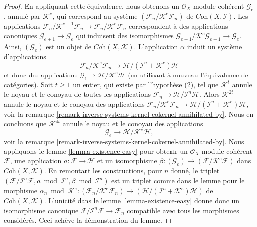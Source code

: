 \begin{proof}
\medskip\noindent
En appliquant cette équivalence, nous obtenons un $\mathcal{O}_X$-module cohérent
$\mathcal{G}_e$, annulé par $\mathcal{K}^e$, qui correspond au système
$(\mathcal{F}_n/\mathcal{K}^e\mathcal{F}_n)$ de
$\textit{Coh}(X, \mathcal{I})$. Les applications
$\mathcal{F}_n/\mathcal{K}^{e + 1}\mathcal{F}_n \to
\mathcal{F}_n/\mathcal{K}^e\mathcal{F}_n$ correspondent à des applications canoniques
$\mathcal{G}_{e + 1} \to \mathcal{G}_e$ qui induisent des isomorphismes
$\mathcal{G}_{e + 1}/\mathcal{K}^e\mathcal{G}_{e + 1} \to \mathcal{G}_e$.
Ainsi, $(\mathcal{G}_e)$ est un objet de $\textit{Coh}(X, \mathcal{K})$.
L'application $\alpha$ induit un système d'applications
$$
\mathcal{F}_n/\mathcal{K}^e\mathcal{F}_n
\longrightarrow
\mathcal{H}/(\mathcal{I}^n + \mathcal{K}^e)\mathcal{H}
$$
et donc des applications $\mathcal{G}_e \to \mathcal{H}/\mathcal{K}^e\mathcal{H}$
(en utilisant à nouveau l'équivalence de catégories).
Soit $t \geq 1$ un entier, qui existe par l'hypothèse (2),
tel que $\mathcal{K}^t$ annule le noyau et le conoyau de toutes les applications
$\mathcal{F}_n \to \mathcal{H}/\mathcal{I}^n\mathcal{H}$.
Alors $\mathcal{K}^{2t}$ annule le noyau et le conoyau des applications
$\mathcal{F}_n/\mathcal{K}^e\mathcal{F}_n \to
\mathcal{H}/(\mathcal{I}^n + \mathcal{K}^e)\mathcal{H}$, voir la
remarque \ref{remark-inverse-systems-kernel-cokernel-annihilated-by}.
Nous en concluons que $\mathcal{K}^{4t}$ annule le noyau et
le conoyau des applications
$$
\mathcal{G}_e
\longrightarrow
\mathcal{H}/\mathcal{K}^e\mathcal{H},
$$
voir la remarque \ref{remark-inverse-systems-kernel-cokernel-annihilated-by}.
Nous appliquons le lemme \ref{lemma-existence-easy} pour obtenir un
$\mathcal{O}_X$-module cohérent $\mathcal{F}$, une application
$a : \mathcal{F} \to \mathcal{H}$ et un isomorphisme
$\beta : (\mathcal{G}_e) \to (\mathcal{F}/\mathcal{K}^e\mathcal{F})$
dans $\textit{Coh}(X, \mathcal{K})$. En remontant les constructions, pour $n$
donné, le triplet
$(\mathcal{F}/\mathcal{I}^n\mathcal{F}, a \bmod \mathcal{I}^n, \beta
\bmod \mathcal{I}^n)$ est un triplet comme dans le lemme pour le morphisme
$\alpha_n \bmod \mathcal{K}^e :
(\mathcal{F}_n/\mathcal{K}^e\mathcal{F}_n) \to
(\mathcal{H}/(\mathcal{I}^n + \mathcal{K}^e)\mathcal{H})$
de $\textit{Coh}(X, \mathcal{K})$. L'unicité dans le
lemme \ref{lemma-existence-easy}
donne donc un isomorphisme canonique
$\mathcal{F}/\mathcal{I}^n\mathcal{F} \to \mathcal{F}_n$
compatible avec tous les morphismes considérés. Ceci achève la
démonstration du lemme.
\end{proof}

